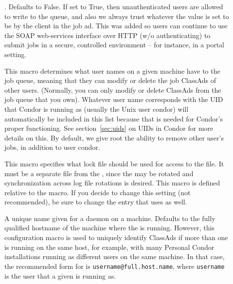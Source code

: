\begin{description}
\item[]. \label{param:QueueAllUsersTrusted}
  Defaults to False. If set to True, then unauthenticated users are allowed
  to write to the queue, and also we always trust whatever the 
  value is set to be by the client in the job ad. This was added so users
  can continue to use the SOAP web-services interface over HTTP (w/o
  authenticating) to submit jobs in a secure, controlled environment -- for
  instance, in a portal setting.
     
\item[] \label{param:QueueSuperUsers} This
  macro determines what user names on a given machine have
   to the job queue, meaning that they can
  modify or delete the job ClassAds of other users.  (Normally, you
  can only modify or delete ClassAds from the job queue that you own).
  Whatever user name corresponds with the UID that Condor is running as
  (usually the Unix user condor) will automatically be included in this list
  because that is needed for Condor's proper functioning.  See
  section~\ref{sec:uids} on UIDs in Condor for more details on
  this.  By default, we give root the ability to remove other
  user's jobs, in addition to user condor.
      
\item[] \label{param:ScheddLock} This macro
  specifies what lock file should be used for access to the
   file.  It must be a separate file from the
  , since the  may be rotated and
  synchronization across log file rotations
  is desired.
  This macro is defined relative to the  macro.
  If you decide to change this setting (not recommended),
  be sure to change the  entry that
   uses as well.

\item[] \label{param:ScheddName}
  A unique name given for a  daemon on a machine.
  Defaults to the fully qualified hostname of the machine where the
   is running.
  However, this configuration macro is used to uniquely identify
   ClassAds if more than one  is running
  on the same host, for example, with many Personal Condor
  installations running as different users on the same machine.
  In that case, the recommended form for  is
  \verb$username@full.host.name$, where \verb$username$ is the
  user that a given  is running as. 


\end{description}
